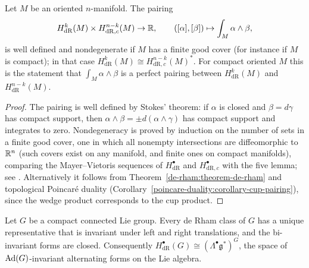 \begin{theorem}\label{de-rham:theorem-poincare-duality-de-rham}
Let $M$ be an oriented $n$-manifold. The pairing
\[
H^k_{\mathrm{dR}}(M) \times H^{n-k}_{\mathrm{dR},c}(M) \to \mathbb{R}, \qquad ([\alpha], [\beta]) \mapsto \int_M\alpha \wedge \beta,
\]
is well defined and nondegenerate if $M$ has a finite good cover (for instance if $M$ is compact); in that case $H^k_{\mathrm{dR}}(M) \cong H^{n-k}_{\mathrm{dR},c}(M)^*$. For compact oriented $M$ this is the
statement that $\int_M\alpha \wedge \beta$ is a perfect pairing between $H^k_{\mathrm{dR}}(M)$ and $H^{n-k}_{\mathrm{dR}}(M)$.
\end{theorem}

\begin{proof}
The pairing is well defined by Stokes' theorem: if $\alpha$ is closed and $\beta = d\gamma$ has compact support, then $\alpha \wedge \beta = \pm d(\alpha \wedge \gamma)$ has compact support and integrates to zero.
Nondegeneracy is proved by induction on the number of sets in a finite good cover, one in which all nonempty intersections are diffeomorphic to $\mathbb{R}^n$ (such covers exist on any manifold, and finite ones
on compact manifolds), comparing the Mayer--Vietoris sequences of $H^\bullet_{\mathrm{dR}}$ and $H^\bullet_{\mathrm{dR},c}$ with the five lemma; see \cite[Chapter I, Section 5]{bott-tu}. Alternatively it follows from Theorem~\ref{de-rham:theorem-de-rham} and topological Poincar\'e duality
(Corollary~\ref{poincare-duality:corollary-cup-pairing}), since the wedge product corresponds to the cup product.
\end{proof}

\begin{theorem}\label{de-rham:theorem-lie-group-cohomology}
Let $G$ be a compact connected Lie group. Every de Rham class of $G$ has a unique representative that is invariant under left and right translations, and the bi-invariant forms are closed. Consequently
$H^\bullet_{\mathrm{dR}}(G) \cong (\Lambda^\bullet\mathfrak{g}^*)^{G}$, the space of $\operatorname{Ad}(G)$-invariant alternating forms on the Lie algebra.
\end{theorem}

